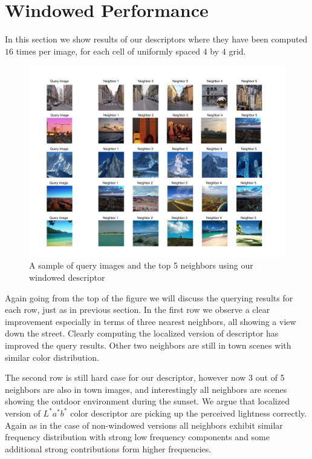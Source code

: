\documentclass{report}
\begin{document}
\section{Windowed Performance}
In this section we show results of our descriptors where they have been computed $16$ times per image, for each cell of uniformly spaced $4$ by $4$ grid.
\begin{figure}[H]
        \centering
        \includegraphics[width=\textwidth]{graphics/windowed_knearest.pdf}
        \caption{A sample of query images and the top 5 neighbors using our windowed descriptor}
        \label{fig:windowed_knearest}
\end{figure}
Again going from the top of the figure we will discuss the querying results for each row, just as in previous section.
In the first row we observe a clear improvement especially in terms of three nearest neighbors, all showing a view down the street. Clearly computing the localized version of descriptor has improved the query results. Other two neighbors are still in town scenes with similar color distribution.

The second row is still hard case for our descriptor, however now 3 out of 5 neighbors are also in town images, and interestingly all neighbors are scenes showing the outdoor environment during the sunset. We argue that localized version of $L^*a^*b^*$ color descriptor are picking up the perceived lightness correctly. Again as in the case of non-windowed versions all neighbors exhibit similar frequency distribution with strong low frequency components and some additional strong contributions form higher frequencies.
\end{document}

